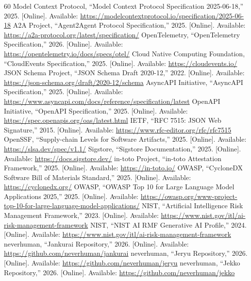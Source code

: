 \documentclass[10pt,journal,onecolumn]{IEEEtran}
\begin{document}
\begin{thebibliography}{60}
 Model Context Protocol, ``Model Context Protocol Specification 2025-06-18,'' 2025. [Online]. Available: \url{https://modelcontextprotocol.io/specification/2025-06-18}
 A2A Project, ``Agent2Agent Protocol Specification,'' 2025. [Online]. Available: \url{https://a2a-protocol.org/latest/specification/}
 OpenTelemetry, ``OpenTelemetry Specification,'' 2026. [Online]. Available: \url{https://opentelemetry.io/docs/specs/otel/}
 Cloud Native Computing Foundation, ``CloudEvents Specification,'' 2025. [Online]. Available: \url{https://cloudevents.io/}
 JSON Schema Project, ``JSON Schema Draft 2020-12,'' 2022. [Online]. Available: \url{https://json-schema.org/draft/2020-12/schema}
 AsyncAPI Initiative, ``AsyncAPI Specification,'' 2025. [Online]. Available: \url{https://www.asyncapi.com/docs/reference/specification/latest}
 OpenAPI Initiative, ``OpenAPI Specification,'' 2025. [Online]. Available: \url{https://spec.openapis.org/oas/latest.html}
 IETF, ``RFC 7515: JSON Web Signature,'' 2015. [Online]. Available: \url{https://www.rfc-editor.org/rfc/rfc7515}
 OpenSSF, ``Supply-chain Levels for Software Artifacts,'' 2025. [Online]. Available: \url{https://slsa.dev/spec/v1.1/}
 Sigstore, ``Sigstore Documentation,'' 2025. [Online]. Available: \url{https://docs.sigstore.dev/}
 in-toto Project, ``in-toto Attestation Framework,'' 2025. [Online]. Available: \url{https://in-toto.io/}
 OWASP, ``CycloneDX Software Bill of Materials Standard,'' 2025. [Online]. Available: \url{https://cyclonedx.org/}
 OWASP, ``OWASP Top 10 for Large Language Model Applications 2025,'' 2025. [Online]. Available: \url{https://owasp.org/www-project-top-10-for-large-language-model-applications/}
 NIST, ``Artificial Intelligence Risk Management Framework,'' 2023. [Online]. Available: \url{https://www.nist.gov/itl/ai-risk-management-framework}
 NIST, ``NIST AI RMF Generative AI Profile,'' 2024. [Online]. Available: \url{https://www.nist.gov/itl/ai-risk-management-framework}
 neverhuman, ``Jankurai Repository,'' 2026. [Online]. Available: \url{https://github.com/neverhuman/jankurai}
 neverhuman, ``Jeryu Repository,'' 2026. [Online]. Available: \url{https://github.com/neverhuman/jeryu}
 neverhuman, ``Jekko Repository,'' 2026. [Online]. Available: \url{https://github.com/neverhuman/jekko}

\end{thebibliography}
\end{document}
